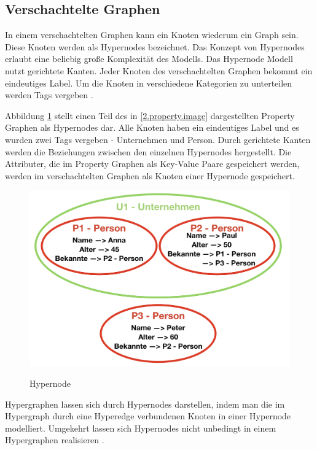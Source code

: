 \subsection{Verschachtelte Graphen}
In einem verschachtelten Graphen kann ein Knoten wiederum ein Graph sein. Diese Knoten werden als Hypernodes bezeichnet.
Das Konzept von Hypernodes erlaubt eine beliebig große Komplexität des Modells.
Das Hypernode Modell nutzt gerichtete Kanten.
Jeder Knoten des verschachtelten Graphen bekommt ein eindeutiges Label.
Um die Knoten in verschiedene Kategorien zu unterteilen werden Tags vergeben \cite{poulovassilis1994nested}.

Abbildung \ref{2.hypernode.image} stellt einen Teil des in \ref{2.property.image} dargestellten Property Graphen als Hypernodes dar.
Alle Knoten haben ein eindeutiges Label und es wurden zwei Tags vergeben - Unternehmen und Person.
Durch gerichtete Kanten werden die Beziehungen zwischen den einzelnen Hypernodes hergestellt.
Die Attributer, die im Property Graphen als Key-Value Paare gespeichert werden, werden im verschachtelten Graphen als Knoten einer Hypernode gespeichert.
\begin{figure}[H]
	\begin{center}
		\includegraphics[scale = 0.5]{./images/Hypernode.png}
		\label{2.hypernode.image}
		\caption{Hypernode}
	\end{center}
\end{figure}

Hypergraphen lassen sich durch Hypernodes darstellen, indem man die im Hypergraph durch eine Hyperedge verbundenen Knoten in einer Hypernode modelliert.
Umgekehrt lassen sich Hypernodes nicht unbedingt in einem Hypergraphen realisieren \cite{poulovassilis1994nested}.